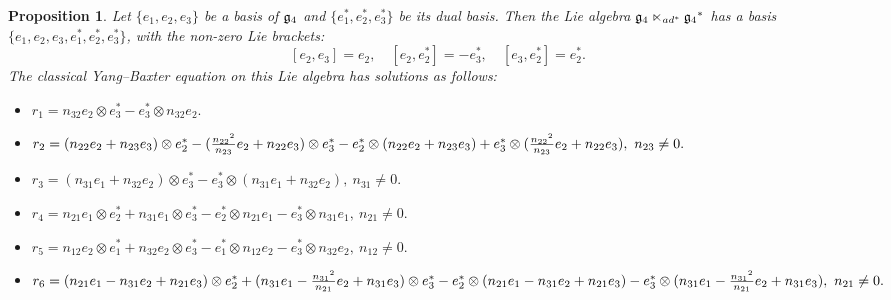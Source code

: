 \documentclass[12pt, reqno]{amsart}
\theoremstyle{plain}
\newtheorem{proposition}[theorem]{Proposition}
\begin{document}
\begin{proposition}\label{pro:CYBEg4}
Let $\{e_{1}, e_{2}, e_{3}\}$ be a basis of ${\frak g_4}$ and  $\{e^{\ast}_{1}, e^{\ast}_{2}, e^{\ast}_{3}\}$ be its dual basis. Then the Lie algebra ${\frak g_4} \ltimes_{{\rm ad}^{\ast}} {\frak g_4}^{\ast}$ has a basis $\{e_1, e_2, e_3, e_1^{\ast}, e_2^{\ast}, e_3^{\ast}\}$, with the non-zero Lie brackets:  
$$  
[e_2, e_3] = e_2, \quad [e_2, e^{\ast}_{2}] = -e^{\ast}_{3}, \quad [e_3, e^{\ast}_{2}] = e^{\ast}_{2}.  
$$  
The classical Yang–Baxter equation on this Lie algebra has solutions as follows:

\begin{itemize}
\item[] \hskip-0.5cm  $r_1 =n_{32}e_2 \otimes e_3^{\ast}-e_3^{\ast} \otimes n_{32}e_2 .$
\item[] \hskip-0.5cm  $r_2=(n_{22}e_2+{n_{23}}e_3) \otimes e_2^{\ast}-(\frac{{n_{22}}^2}{n_{23}}e_2+n_{22}e_3) \otimes e_3^{\ast}\\
    -
e_2^{\ast} \otimes (n_{22}e_2+{n_{23}}e_3)+ e_3^{\ast}\otimes (\frac{{n_{22}}^2}{n_{23}}e_2+n_{22}e_3),~n_{23}\neq0.$
\item[]\hskip-0.5cm  $ r_3=(n_{31}e_1+n_{32}e_2)\otimes e_3^{\ast}-e_3^{\ast}\otimes(n_{31}e_1+n_{32}e_2),~n_{31}\neq0.$
\item[]\hskip-0.5cm  $r_4=n_{21}e_1 \otimes e_2^{\ast}+n_{31}e_1 \otimes e_3^{\ast}-e_2^{\ast} \otimes n_{21}e_1- e_3^{\ast}\otimes n_{31}e_1,~n_{21}\neq0.$
\item[]\hskip-0.5cm  $r_5=n_{12}e_2 \otimes e_1^{\ast}+n_{32}e_2 \otimes e_3^{\ast}-e_1^{\ast} \otimes n_{12}e_2- e_3^{\ast}\otimes n_{32}e_2,~n_{12}\neq0.$
\item[]\hskip-0.5cm  $r_6=(n_{21}e_1-n_{31}e_2+{n_{21}}e_3) \otimes e_2^{\ast}+(n_{31}e_1-\frac{{n_{31}}^2}{n_{21}}e_2+n_{31}e_3) \otimes e_3^{\ast}\\-
e_2^{\ast} \otimes (n_{21}e_1-n_{31}e_2+{n_{21}}e_3)- e_3^{\ast}\otimes (n_{31}e_1-\frac{{n_{31}}^2}{n_{21}}e_2+n_{31}e_3),~n_{21}\neq0.$
\end{itemize}
\end{proposition}
\end{document}

